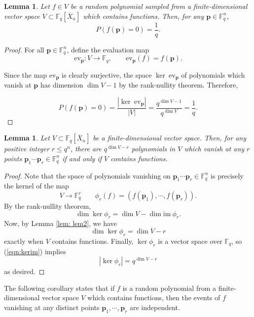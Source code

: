 \documentclass[12pt]{amsart}
\newtheorem{lemma}[theorem]{Lemma}
\theoremstyle{definition}
\newcommand{\FF}{\mathbb{F} }
\newcommand{\bp}{\mathbf{p} }
\begin{document}
\begin{lemma}\label{lem: lem3}
Let $f \in V$ be a random polynomial sampled from  a finite-dimensional vector space $V \subset \FF_q[\overline{X}_n]$ which contains functions. Then, for any $\bp \in \FF_q^n$,
\[
P \left( f(\bp) = 0 \right) = \frac{1}{q}.
\]
\end{lemma}

\begin{proof}
For all $\bp \in \FF_q^n$, define the evaluation map
\[
\mathrm{ev}_{\bp}: V \to \FF_q, \qquad \mathrm{ev}_{\bp}(f) = f(\bp).
\]

Since the map $\mathrm{ev}_{\bp}$ is clearly surjective, the space $\ker \ \mathrm{ev}_{\bp}$ of polynomials which vanish at $\bp$ has dimension $\dim V - 1$ by the rank-nullity theorem. Therefore,

\[
P \left( f(\bp) = 0 \right) = \frac{|\ker \ \mathrm{ev}_{\bp}|}{|V|} = \frac{q^{\dim V - 1}}{q^{\dim V}} = \frac{1}{q}.
\]
\end{proof}

\begin{lemma}\label{lem: niceref}
Let $V \subset \FF_q[\overline{X}_n]$ be a finite-dimensional vector space. Then, for any positive integer $r \le q^n$, there are $q^{\dim V - r}$ polynomials in $V$ which vanish at any $r$ points $\bp_1 \cdots \bp_r \in \FF_q^n$ if and only if $V$ contains functions.
\end{lemma}

\begin{proof}
Note that the space of polynomials vanishing on $\bp_1 \cdots \bp_r \in \FF_q^n$ is precisely the kernel of the map
\[
V \to \FF_q^{r} \qquad \phi_r(f) = (f(\bp_{1}), \cdots , f(\bp_{r})).
\]
By the rank-nullity theorem,
\[
\dim \ker \phi_r= \dim V - \dim \mathrm{im} \ \phi_r.
\]
Now, by Lemma \ref{lem: lem2}, we have
\begin{equation}\label{eqn:kerim}
\dim \ker \phi_r= \dim V - r
\end{equation}
exactly when $V$ contains functions. Finally, $\ker \phi_r$ is a vector space over $\FF_q$, so (\ref{eqn:kerim}) implies 
\[
|\ker \phi_r| = q^{\dim V -r}
\]
as desired.
\end{proof}

The following corollary states that if $f$ is a random polynomial from a finite-dimensional vector space $V$ which contains functions, then the events of $f$ vanishing at any distinct points $\bp_1, \cdots , \bp_r$ are independent.
\end{document}
